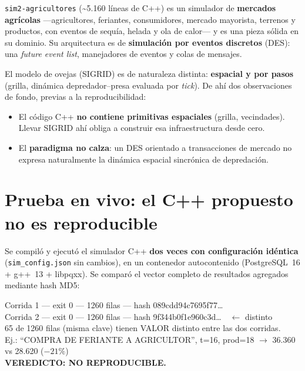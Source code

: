 \documentclass[11pt,a4paper]{article}
\newcommand{\code}[1]{\texttt{\small #1}}
\begin{document}
\code{sim2-agricultores} (\textasciitilde5.160 líneas de C++) es un simulador de
\textbf{mercados agrícolas} —agricultores, feriantes, consumidores, mercado
mayorista, terrenos y productos, con eventos de sequía, helada y ola de calor— y
es una pieza sólida en su dominio. Su arquitectura es de \textbf{simulación por
eventos discretos} (DES): una \emph{future event list}, manejadores de eventos y
colas de mensajes.

El modelo de ovejas (SIGRID) es de naturaleza distinta: \textbf{espacial y por
pasos} (grilla, dinámica depredador--presa evaluada por \emph{tick}). De ahí dos
observaciones de fondo, previas a la reproducibilidad:

\begin{itemize}[leftmargin=1.4em,itemsep=2pt]
  \item El código C++ \textbf{no contiene primitivas espaciales} (grilla,
  vecindades). Llevar SIGRID ahí obliga a construir esa infraestructura desde
  cero.
  \item El \textbf{paradigma no calza}: un DES orientado a transacciones de
  mercado no expresa naturalmente la dinámica espacial sincrónica de depredación.
\end{itemize}

\section{Prueba en vivo: el C++ propuesto no es reproducible}

Se compiló y ejecutó el simulador C++ \textbf{dos veces con configuración
idéntica} (\code{sim\_config.json} sin cambios), en un contenedor autocontenido
(PostgreSQL~16 + g++~13 + libpqxx). Se comparó el vector completo de resultados
agregados mediante hash MD5:

\begin{tcolorbox}[colback=black!3,colframe=ln,boxrule=0.5pt,arc=2pt,fontupper=\ttfamily\small]
Corrida 1 — exit 0 — 1260 filas — hash \textcolor{cop}{089cdd94c7695f77\dots} \\
Corrida 2 — exit 0 — 1260 filas — hash \textcolor{cop}{9f344b0f1e960c3d\dots}\ \ $\leftarrow$ distinto \\[4pt]
65 de 1260 filas (misma clave) tienen VALOR distinto entre las dos corridas. \\
Ej.: ``COMPRA DE FERIANTE A AGRICULTOR'', t=16, prod=18 $\rightarrow$ 36.360 vs 28.620 ($-21\%$) \\[4pt]
\textbf{VEREDICTO: NO REPRODUCIBLE.}
\end{tcolorbox}
\end{document}
